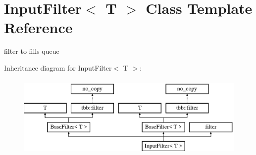 \hypertarget{classInputFilter}{}\section{Input\+Filter$<$ T $>$ Class Template Reference}
\label{classInputFilter}


filter to fills queue  


Inheritance diagram for Input\+Filter$<$ T $>$\+:\begin{figure}[H]
\begin{center}
\leavevmode
\includegraphics[height=4.000000cm]{classInputFilter}
\end{center}
\end{figure}
